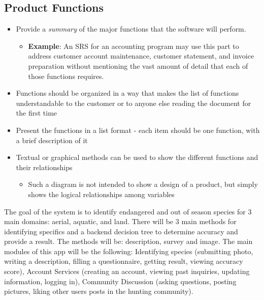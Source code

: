 \documentclass[]{article}
\begin{document}
\subsection{Product Functions}
\label{sub:product_functions}
\begin{itemize}
	\item Provide a \emph{summary} of the major functions that the software will perform.
	\begin{itemize}
		\item \textbf{Example}: An SRS for an accounting program may use this part to address customer account maintenance, customer statement, and invoice preparation without mentioning the vast amount of detail that each of those functions requires.
	\end{itemize}
	\item Functions should be organized in a way that makes the list of functions understandable to the customer or to anyone else reading the document for the first time 
	\item Present the functions in a list format - each item should be one function, with a brief description of it
	\item Textual or graphical methods can be used to show the different functions and their relationships
	\begin{itemize}
		\item Such a diagram is not intended to show a design of a product, but simply shows the logical relationships among variables
	\end{itemize} 
\end{itemize}
The goal of the system is to identify endangered and out of season species for 3 main domains: aerial, aquatic, and land. There will be 3 main methods for identifying specifics and a backend decision tree to determine accuracy and provide a result. The methods will be: description, survey and image. The main modules of this app will be the following: Identifying species (submitting photo, writing a description, filling a questionnaire, getting result, viewing accuracy score), Account Services (creating an account, viewing past inquiries, updating information, logging in), Community Discussion (asking questions, posting pictures, liking other users posts in the hunting community). 
\end{document}
